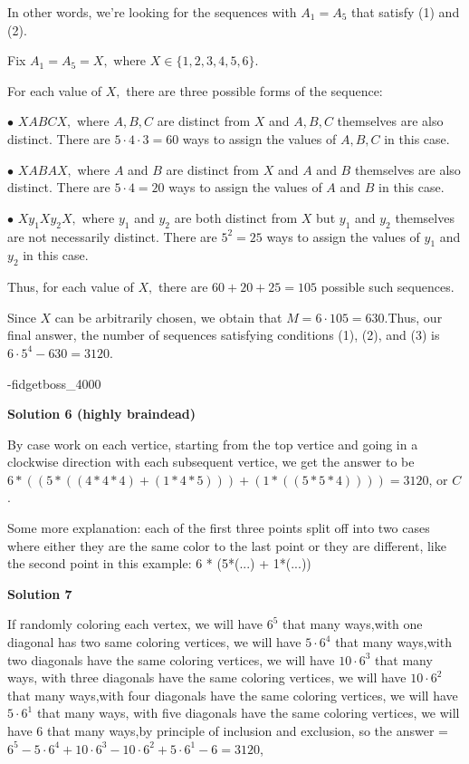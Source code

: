 \begin{enumerate}
 In other words, we're looking for the sequences with $A_1 = A_5$ that satisfy (1) and (2).

 Fix $A_1 = A_5 = X,$ where $X \in \{1, 2, 3, 4, 5, 6\}.$ 

 For each value of $X,$ there are three possible forms of the sequence:

 $\bullet$ $X A B C X,$ where $A, B, C$ are distinct from $X$ and $A, B, C$ themselves are also distinct. There are $5 \cdot 4 \cdot 3 = 60$ ways to assign the values of $A, B, C$ in this case. 

 $\bullet$ $X A B A X,$ where $A$ and $B$ are distinct from $X$ and $A$ and $B$ themselves are also distinct. There are $5 \cdot 4 = 20$ ways to assign the values of $A$ and $B$ in this case.

 $\bullet$ $X y_1 X y_2 X,$ where $y_1$ and $y_2$ are both distinct from $X$ but $y_1$ and $y_2$ themselves are not necessarily distinct. There are $5^2 = 25$ ways to assign the values of $y_1$ and $y_2$ in this case.

 Thus, for each value of $X,$ there are $60 + 20 + 25 = 105$ possible such sequences.

 Since $X$ can be arbitrarily chosen, we obtain that $M = 6 \cdot 105 = 630.$Thus, our final answer, the number of sequences satisfying conditions (1), (2), and (3) is $6 \cdot 5^4 - 630 = \boxed{3120}.$

 -fidgetboss\_4000

 



\textbf{Solution 6 (highly braindead)}

By case work on each vertice, starting from the top vertice and going in a clockwise direction with each subsequent vertice, we get the answer to be $6*( (5*( (4 * 4 * 4) + (1 * 4 * 5) )) + (1*( (5 * 5 * 4) )) ) = \boxed{3120}$, or $C$.

 Some more explanation: each of the first three points split off into two cases where either they are the same color to the last point or they are different, like the second point in this example: 6 * (5*(...) + 1*(...))

 



\textbf{Solution 7}

If randomly coloring each vertex, we will have $6^5$ that many ways,with one diagonal has two same coloring vertices, we will have $5\cdot 6^4$ that many ways,with two diagonals have the same coloring vertices, we will have $10\cdot 6^3$ that many ways, with three diagonals have the same coloring vertices, we will have $10\cdot 6^2$ that many ways,with four diagonals have the same coloring vertices, we will have $5\cdot 6^1$ that many ways, with five diagonals have the same coloring vertices, we will have $6$ that many ways,by principle of inclusion and exclusion, so the answer = $6^5-5\cdot 6^4+10\cdot 6^3-10\cdot 6^2+5\cdot 6^1-6=3120$,


\end{enumerate}
